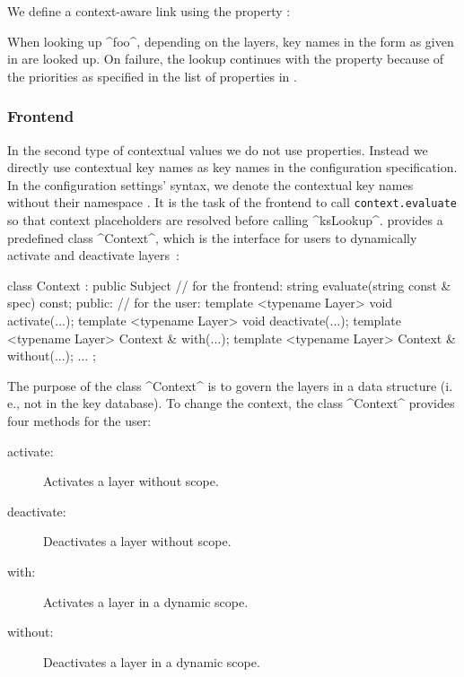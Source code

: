 \begin{example}
We define a context-aware link using the property :


When looking up ^foo^, depending on the layers, key names in the form as given in  are looked up.
On failure, the lookup continues with the property  because of the priorities as specified in the list of properties in .
\end{example}

\subsubsection{Frontend}
\label{sec:approach-users-view-frontend}

In the second type of contextual values we do not use properties.
Instead we directly use contextual key names as key names in the configuration specification.
In the configuration settings' syntax, we denote the contextual key names without their namespace .
It is the task of the frontend to call \texttt{context.eval\-uate} so that context placeholders are resolved before calling ^ksLookup^.
 provides a predefined class ^Context^, which is the interface for users to dynamically activate and deactivate layers~\cite{raab2014program}:

\begin{code}[language=Cpp]
class Context : public Subject
{       // for the frontend:
	string evaluate(string const & spec) const;
public: // for the user:
	template <typename Layer> void activate(...);
	template <typename Layer> void deactivate(...);
	template <typename Layer> Context & with(...);
	template <typename Layer> Context & without(...);
	...
};
\end{code}

The purpose of the class ^Context^ is to govern the layers in a data structure (i.\,e., not in the key database).
To change the context, the class ^Context^ provides four methods for the user:

\begin{description}
\item[activate:]   Activates a layer without scope.
\item[deactivate:]  Deactivates a layer without scope.
\item[with:] Activates a layer in a dynamic scope.
\item[without:] Deactivates a layer in a dynamic scope.
\end{description}

